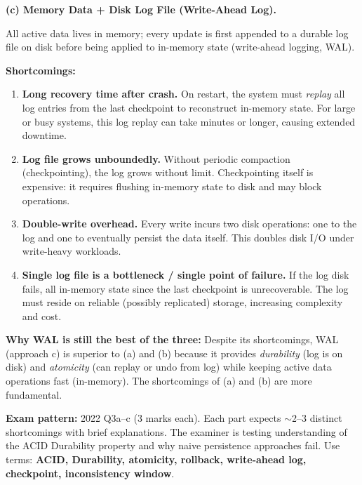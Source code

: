 \documentclass[12pt,a4paper]{article}
\begin{document}
\begin{solbox}
\textbf{(c) Memory Data + Disk Log File (Write-Ahead Log).}

All active data lives in memory; every update is first appended to a durable log file
on disk before being applied to in-memory state (write-ahead logging, WAL).

\textbf{Shortcomings:}
\begin{enumerate}
  \item \textbf{Long recovery time after crash.}
        On restart, the system must \emph{replay} all log entries from the last checkpoint
        to reconstruct in-memory state. For large or busy systems, this log replay can take
        minutes or longer, causing extended downtime.

  \item \textbf{Log file grows unboundedly.}
        Without periodic compaction (checkpointing), the log grows without limit.
        Checkpointing itself is expensive: it requires flushing in-memory state to disk
        and may block operations.

  \item \textbf{Double-write overhead.}
        Every write incurs two disk operations: one to the log and one to eventually
        persist the data itself. This doubles disk I/O under write-heavy workloads.

  \item \textbf{Single log file is a bottleneck / single point of failure.}
        If the log disk fails, all in-memory state since the last checkpoint is
        unrecoverable. The log must reside on reliable (possibly replicated) storage,
        increasing complexity and cost.
\end{enumerate}

\textbf{Why WAL is still the best of the three:}
Despite its shortcomings, WAL (approach c) is superior to (a) and (b) because it
provides \emph{durability} (log is on disk) and \emph{atomicity} (can replay or undo
from log) while keeping active data operations fast (in-memory). The shortcomings of
(a) and (b) are more fundamental.
\end{solbox}

\begin{notesbox}
\textbf{Exam pattern:} 2022 Q3a–c (3 marks each). Each part expects $\sim$2–3 distinct
shortcomings with brief explanations. The examiner is testing understanding of the
ACID Durability property and why naive persistence approaches fail.
Use terms: \textbf{ACID, Durability, atomicity, rollback, write-ahead log, checkpoint,
inconsistency window}.
\end{notesbox}
\end{document}
